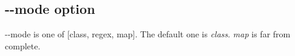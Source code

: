 \subsection{-{}-mode option}

-{}-mode is one of [class, regex, map]. The default one is \emph{class}.
\emph{map} is far from complete.

